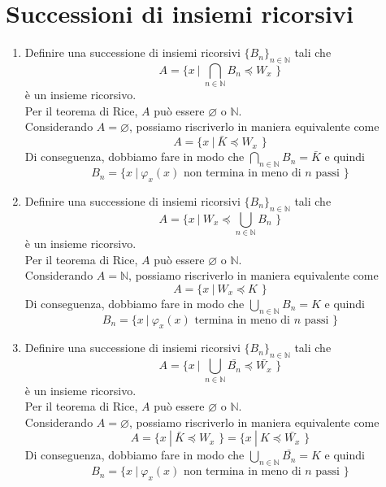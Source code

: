 \documentclass[a4paper,oneside,titlepage]{book}
\begin{document}
\section{Successioni di insiemi ricorsivi}
\begin{enumerate}[label=\fbox{\arabic*}]
\item Definire una successione di insiemi ricorsivi $\{B_n\}_{n \in \mathbb{N}}$ tali che
\[ A = \text{\{ } x \ | \ \bigcap_{n \in \mathbb{N}} B_n \preceq W_x \text{ \}} \]
è un insieme ricorsivo.
\\ Per il teorema di Rice, $A$ può essere $\varnothing$ o $\mathbb{N}$.
\\ Considerando $A = \varnothing$, possiamo riscriverlo in maniera equivalente come
\[ A = \text{\{ } x \ | \ \bar{K} \preceq W_x \text{ \}} \]
Di conseguenza, dobbiamo fare in modo che $\bigcap_{n \in \mathbb{N}} B_n = \bar{K}$ e quindi
\[ B_n = \text{\{ } x \ | \ \varphi_x(x) \text{ non termina in meno di } n \text{ passi \}} \]

\item Definire una successione di insiemi ricorsivi $\{B_n\}_{n \in \mathbb{N}}$ tali che
\[ A = \text{\{ } x \ | \ W_x \preceq \bigcup_{n \in \mathbb{N}} B_n \text{ \}} \]
è un insieme ricorsivo.
\\ Per il teorema di Rice, $A$ può essere $\varnothing$ o $\mathbb{N}$.
\\ Considerando $A = \mathbb{N}$, possiamo riscriverlo in maniera equivalente come
\[ A = \text{\{ } x \ | \ W_x \preceq K \text{ \}} \]
Di conseguenza, dobbiamo fare in modo che $\bigcup_{n \in \mathbb{N}} B_n = K$ e quindi
\[ B_n = \text{\{ } x \ | \ \varphi_x(x) \text{ termina in meno di } n \text{ passi \}} \]

\item Definire una successione di insiemi ricorsivi $\{B_n\}_{n \in \mathbb{N}}$ tali che
\[ A = \text{\{ } x \ | \ \bigcup_{n \in \mathbb{N}} \bar{B_n} \preceq \bar{W_x} \text{ \}} \]
è un insieme ricorsivo.
\\ Per il teorema di Rice, $A$ può essere $\varnothing$ o $\mathbb{N}$.
\\ Considerando $A = \varnothing$, possiamo riscriverlo in maniera equivalente come
\[ A = \text{\{ } x \ | \ \bar{K} \preceq W_x \text{ \}} = \text{\{ } x \ | \ K \preceq \bar{W_x} \text{ \}} \]
Di conseguenza, dobbiamo fare in modo che $\bigcup_{n \in \mathbb{N}} \bar{B_n} = K$ e quindi
\[ B_n = \text{\{ } x \ | \ \varphi_x(x) \text{ non termina in meno di } n \text{ passi \}} \]


\end{enumerate}
\end{document}
